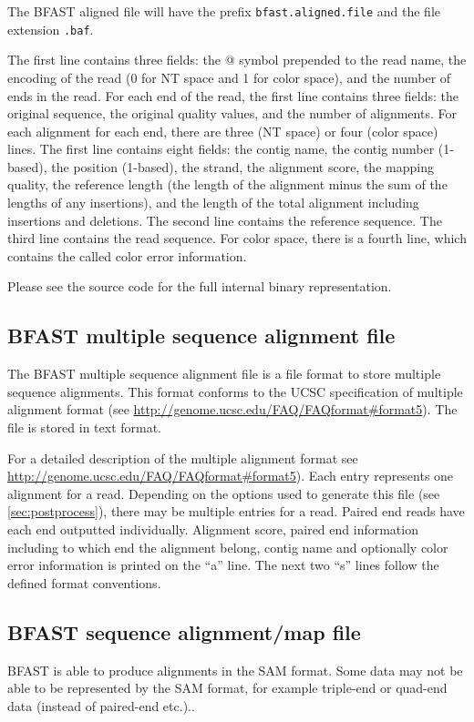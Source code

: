 \documentclass[a4paper,12pt]{book}
\newcommand{\TT}[1]{{\tt #1}} %
\newcommand{\QU}[1]{``#1''} %
\newcommand{\BAF}{BFAST aligned file} %
\newcommand{\BMAF}{BFAST multiple sequence alignment file} %
\newcommand{\BSAMF}{BFAST sequence alignment/map file} %
\begin{document}
The \BAF{} will have the prefix \TT{bfast.aligned.file} and the file extension \TT{.baf}.

The first line contains three fields: the @ symbol prepended to the read name, the encoding of the read (0 for NT space and 1 for color space), and the number of ends in the read.
For each end of the read, the first line contains three fields: the original sequence, the original quality values, and the number of alignments.
For each alignment for each end, there are three (NT space) or four (color space) lines.
The first line contains eight fields: the contig name, the contig number (1-based), the position (1-based), the strand, the alignment score, the mapping quality, the reference length (the length of the alignment minus the sum of the lengths of any insertions), and the length of the total alignment including insertions and deletions.
The second line contains the reference sequence.
The third line contains the read sequence.
For color space, there is a fourth line, which contains the called color error information.

Please see the source code for the full internal binary representation.

\subsection{\BMAF{}}
\label{sec:bmaf}
The \BMAF{} is a file format to store multiple sequence alignments.
This format conforms to the UCSC specification of  multiple alignment format (see \url{http://genome.ucsc.edu/FAQ/FAQformat#format5}).
The file is stored in text format.

For a detailed description of the multiple alignment format see \url{http://genome.ucsc.edu/FAQ/FAQformat#format5}).
Each entry represents one alignment for a read. 
Depending on the options used to generate this file (see \autoref{sec:postprocess}), there may be multiple entries for a read.
Paired end reads have each end outputted individually.
Alignment score, paired end information including to which end the alignment belong, contig name and optionally color error information is printed on the \QU{a} line.
The next two \QU{s} lines follow the defined format conventions.

\subsection{\BSAMF{}}
BFAST is able to produce alignments in the SAM format.
Some data may not be able to be represented by the SAM format, for example triple-end or quad-end data (instead of paired-end etc.)..
\end{document}
